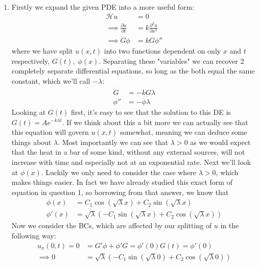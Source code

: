\documentclass[12pt]{article}
\numberwithin{equation}{section}
\numberwithin{figure}{section}
\begin{document}
\begin{enumerate}
\begin{enumerate}
            \item Firstly we expand the given PDE into a more useful form:
            \begin{align*}
                \mathcal{H}u&=0\\
                \implies \frac{\partial u}{\partial t}&=k\frac{\partial^2 u}{\partial x^2}\\
                \implies \dot{G}\phi &= kG\phi''
            \end{align*}
            where we have split $u(x,t)$ into two functions dependent on only $x$ and $t$ respectively, $G(t),\;\phi(x)$.
            Separating these "variables" we can recover 2 completely separate differential equations, so long 
            as the both equal the same constant, which we'll call $-\lambda$:
            \begin{align*}
                \dot{G}&=-kG\lambda\\
                \phi''&=-\phi\lambda
            \end{align*}
            Looking at $G(t)$ first, it's easy to see that the solution to this DE is $G(t)=Ae^{-k\lambda t}$. 
            If we think about this a bit more we can actually see that this equation will govern $u(x,t)$ 
            somewhat, meaning we can deduce some things about $\lambda$. Most importantly we can see that 
            $\lambda>0$ as we would expect that the heat in a bar of some kind, without any external sources, 
            will not increase with time and especially not at an exponential rate. \newline
            Next we'll look at $\phi(x)$. Luckily we only need to consider the case where $\lambda>0$, which 
            makes things easier. In fact we have already studied this exact form of equation in question 1, so 
            borrowing from that answer, we know that 
            \begin{align*}
                \phi(x)&=C_1\cos(\sqrt\lambda x)+C_2\sin(\sqrt\lambda x)\\
                \phi'(x)&=\sqrt{\lambda}(-C_1\sin(\sqrt{\lambda}x)+C_2\cos(\sqrt{\lambda}x))
            \end{align*}
            Now we consider the BCs, which are affected by our splitting of $u$ in the following way:
            \begin{align*}
                u_x(0,t)=0&=G'\phi+\phi' G=\phi'(0)G(t)=\phi'(0)\\
                \implies 0&=\sqrt{\lambda}(-C_1\sin(\sqrt{\lambda}0)+C_2\cos(\sqrt{\lambda}0))\\

\end{align*}
\end{enumerate}
\end{enumerate}
\end{document}
